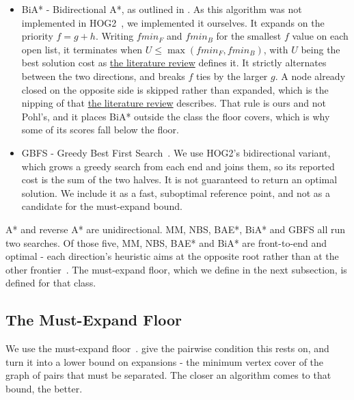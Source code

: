 \documentclass[letterpaper]{article} %
\begin{document}
\begin{itemize}
  \item BiA* - Bidirectional A*, as outlined in \citealt{pohl1971bidirectional}. As this algorithm was not implemented in HOG2~\cite{sturtevant2016hog2}, we implemented it ourselves. It expands on the priority $f = g+h$. Writing $fmin_F$ and $fmin_B$ for the smallest $f$ value on each open list, it terminates when $U \le \max(fmin_F, fmin_B)$, with $U$ being the best solution cost as \hyperref[sec:litrev]{the literature review} defines it. It strictly alternates between the two directions, and breaks $f$ ties by the larger $g$. A node already closed on the opposite side is skipped rather than expanded, which is the nipping of \citet{kwa1989bs} that \hyperref[sec:litrev]{the literature review} describes. That rule is ours and not Pohl's, and it places BiA* outside the class the floor covers, which is why some of its scores fall below the floor.
  \item GBFS - Greedy Best First Search~\cite{pearl1984heuristics}. We use HOG2's bidirectional variant, which grows a greedy search from each end and joins them, so its reported cost is the sum of the two halves. It is not guaranteed to return an optimal solution. We include it as a fast, suboptimal reference point, and not as a candidate for the must-expand bound.
\end{itemize} A* and reverse A* are unidirectional. MM, NBS, BAE*, BiA* and GBFS all run two searches. Of those five, MM, NBS, BAE* and BiA* are front-to-end and optimal - each direction's heuristic aims at the opposite root rather than at the other frontier~\cite{kaindl1997reconsidered}. The must-expand floor, which we define in the next subsection, is defined for that class.

\subsection{The Must-Expand Floor}
We use the must-expand floor~\cite{eckerle2017sufficient, shaham2017minimal}. \citet{eckerle2017sufficient} give the pairwise condition this rests on, and \citet{chen2017nbs} turn it into a lower bound on expansions - the minimum vertex cover of the graph of pairs that must be separated. The closer an algorithm comes to that bound, the better.
\end{document}
